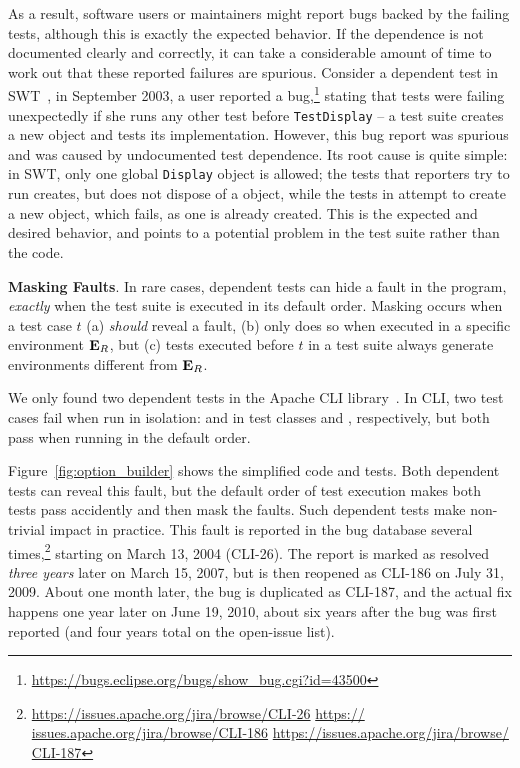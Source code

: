 As a result, software users or maintainers
might report bugs backed by the failing tests, although this
is exactly the expected behavior. 
If the dependence is not documented clearly and
correctly, it can take a considerable amount of time to work out that
these reported failures are spurious.
Consider a dependent test in SWT~\cite{swt},
in September 2003, a user reported a
bug,\footnote{\url{https://bugs.eclipse.org/bugs/show_bug.cgi?id=43500}}
stating that tests were failing unexpectedly
if she runs any other test before \texttt{TestDisplay} --
a test suite creates a new  object and tests its
implementation. However, this bug report was spurious and was
caused by undocumented test dependence.
Its root cause is quite simple: in SWT, only one global \texttt{Display}
object is allowed; the tests that reporters try to run
creates, but does not dispose of a  object, while
the tests in  attempt to create
a new  object, which fails, as one
is already created. This is the expected and desired behavior,
and points to a potential problem in the test suite rather
than the code.

\vspace{1mm}

\noindent \textbf{Masking Faults}. In rare cases,
dependent tests can hide a fault in the
program, \emph{exactly} when the test suite is executed in its default
order. Masking occurs when a test case $t$ (a) \emph{should}
reveal a fault, (b) only does so when executed in a specific environment
$\mathbf{E}_R$, but (c) tests executed before $t$ in a test suite always
generate environments different from
$\mathbf{E}_R$.



We only found two dependent tests in
the Apache CLI library~\cite{cli}.
In CLI, two test cases fail when run in isolation:
 and  in test
classes  and ,
respectively, but both pass when running in the default order.

Figure~\ref{fig:option_builder} shows the simplified code and
tests. Both dependent tests can reveal this fault,  but
the default order of test execution makes both tests pass
accidently and then mask the faults. Such dependent tests
make non-trivial impact in practice.
This fault is reported in the bug
database several times,\footnote{\url{https://issues.apache.org/jira/browse/CLI-26} \url{https://
issues.apache.org/jira/browse/CLI-186} \url{https://issues.apache.org/jira/browse/
CLI-187}} starting on March 13, 2004 (CLI-26). The report is marked as resolved
\emph{three years} later on March 15, 2007, but is then reopened as CLI-186 on
July 31, 2009. About one month later, the bug is duplicated as
CLI-187, and the actual fix happens one 
year later on June 19, 2010, about six years after the bug was first reported (and four years
total on the open-issue list).


